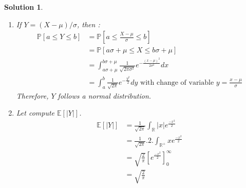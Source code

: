 \documentclass{article}
\newcommand{\proba}[1]{\mathbb{P}[#1]}
\newcommand{\esperance}[1]{\mathbb{E}[#1]}
\newcommand{\R}{\mathbb{R}}
\newtheorem{solution}{Solution}
\begin{document}
\begin{solution}
  \begin{enumerate}
    \item If $Y=(X-\mu)/\sigma$, then :
          \begin{align*}
            \proba{a \leq Y \leq b} & = \proba{a \leq \frac{X-\mu}{\sigma} \leq b}                                                                     \\
                                    & = \proba{a\sigma + \mu \leq X \leq b\sigma + \mu}                                                                \\
                                    & = \int_{a\sigma + \mu}^{b\sigma + \mu} \frac{1}{\sqrt{2\pi \sigma^2}} e^{-\frac{{(x-\mu)}^2}{2\sigma^2}} dx      \\
                                    & = \int_a^b \frac{1}{\sqrt{2\pi}} e^{-\frac{y^2}{2}} dy \text{ with change of variable } y = \frac{x-\mu}{\sigma}
          \end{align*}
          Therefore, $Y$ follows a normal distribution.
    \item Let compute $\esperance{|Y|}$.
          \begin{align*}
            \esperance{|Y|} & = \frac{1}{\sqrt{2\pi}} \int_\R |x| e^{\frac{-x^2}{2}}            \\
                            & = \frac{1}{\sqrt{2\pi}}.2. \int_{\R^+} x e^{\frac{-x^2}{2}}       \\
                            & = \sqrt{\frac{2}{\pi}} \left[ e^{\frac{-x^2}{2}} \right]_0^\infty \\
                            & = \sqrt{\frac{2}{\pi}}
          \end{align*}
  \end{enumerate}
\end{solution}
\end{document}
